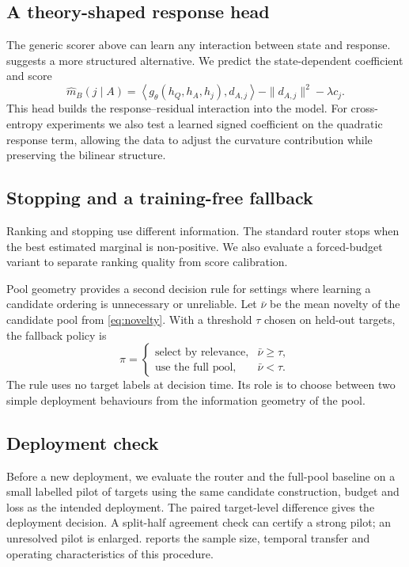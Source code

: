 \subsection{A theory-shaped response head}

The generic scorer above can learn any interaction between state and response.
 suggests a more structured alternative. We predict the
state-dependent coefficient and score
\begin{equation}
 \widehat m_B(j\mid A)
 =
 \left\langle g_\theta(h_Q,h_A,h_j),d_{A,j}\right\rangle
 -\|d_{A,j}\|^2-\lambda c_j .
 \label{eq:bilinear-head}
\end{equation}
This head builds the response--residual interaction into the model. For
cross-entropy experiments we also test a learned signed coefficient on the
quadratic response term, allowing the data to adjust the curvature contribution
while preserving the bilinear structure.

\subsection{Stopping and a training-free fallback}

Ranking and stopping use different information. The standard router stops when
the best estimated marginal is non-positive. We also evaluate a forced-budget
variant to separate ranking quality from score calibration.

Pool geometry provides a second decision rule for settings where learning a
candidate ordering is unnecessary or unreliable. Let $\bar\nu$ be the mean
novelty of the candidate pool from \cref{eq:novelty}. With a threshold $\tau$
chosen on held-out targets, the fallback policy is
\begin{equation}
 \pi=
 \begin{cases}
  \text{select by relevance}, & \bar\nu\ge\tau,\\
  \text{use the full pool}, & \bar\nu<\tau.
 \end{cases}
 \label{eq:adaptive-rule}
\end{equation}
The rule uses no target labels at decision time. Its role is to choose between
two simple deployment behaviours from the information geometry of the pool.

\subsection{Deployment check}

Before a new deployment, we evaluate the router and the full-pool baseline on a
small labelled pilot of targets using the same candidate construction, budget
and loss as the intended deployment. The paired target-level difference gives
the deployment decision. A split-half agreement check can certify a strong
pilot; an unresolved pilot is enlarged.  reports the
sample size, temporal transfer and operating characteristics of this procedure.
